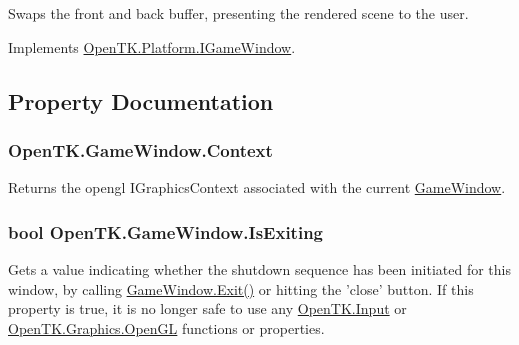 Swaps the front and back buffer, presenting the rendered scene to the user. 



Implements \hyperlink{interface_open_t_k_1_1_platform_1_1_i_game_window_a1a426b9c39d98f557b702fe4ef91c007}{Open\-T\-K.\-Platform.\-I\-Game\-Window}.



\subsection{Property Documentation}
\hypertarget{class_open_t_k_1_1_game_window_a5c17f9c8850e2c20c23bf855bb303cb1}{
\subsubsection[{Context}]{ Open\-T\-K.\-Game\-Window.\-Context\hspace{0.3cm}{\ttfamily [get]}}}\label{class_open_t_k_1_1_game_window_a5c17f9c8850e2c20c23bf855bb303cb1}


Returns the opengl I\-Graphics\-Context associated with the current \hyperlink{class_open_t_k_1_1_game_window}{Game\-Window}. 

\hypertarget{class_open_t_k_1_1_game_window_a0ec80251b70858617ce91d3aa65a8174}{
\subsubsection[{Is\-Exiting}]{\setlength{\rightskip}{0pt plus 5cm}bool Open\-T\-K.\-Game\-Window.\-Is\-Exiting\hspace{0.3cm}{\ttfamily [get]}}}\label{class_open_t_k_1_1_game_window_a0ec80251b70858617ce91d3aa65a8174}


Gets a value indicating whether the shutdown sequence has been initiated for this window, by calling \hyperlink{class_open_t_k_1_1_game_window_a67c26214c431300b56b0f4a88bbbd244}{Game\-Window.\-Exit()} or hitting the 'close' button. If this property is true, it is no longer safe to use any \hyperlink{namespace_open_t_k_1_1_input}{Open\-T\-K.\-Input} or \hyperlink{namespace_open_t_k_1_1_graphics_1_1_open_g_l}{Open\-T\-K.\-Graphics.\-Open\-G\-L} functions or properties. 

